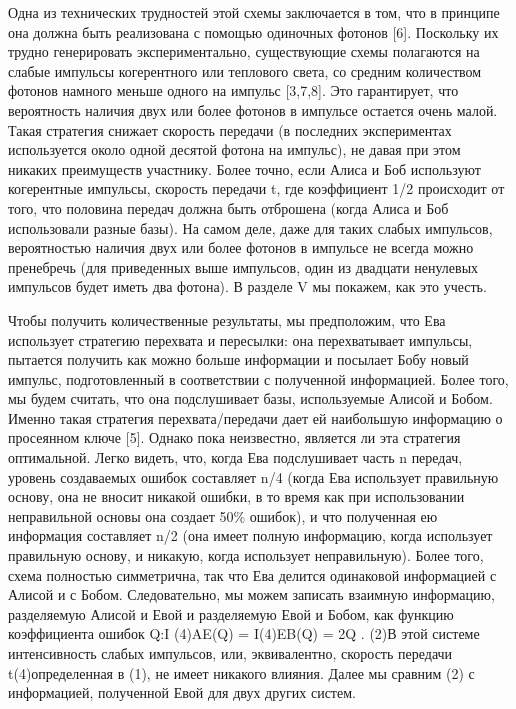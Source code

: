 Одна из технических трудностей этой схемы заключается в том, что в принципе она должна быть реализована с помощью одиночных фотонов [6]. Поскольку их трудно генерировать экспериментально, существующие схемы полагаются на слабые импульсы когерентного или теплового света, со средним количеством фотонов намного меньше одного на импульс [3,7,8]. Это гарантирует, что вероятность наличия двух или более фотонов в импульсе остается очень малой. Такая стратегия снижает скорость передачи (в последних экспериментах используется около одной десятой фотона на импульс), не давая при этом никаких преимуществ участнику. Более точно, если Алиса и Боб используют когерентные импульсы, скорость передачи t, где коэффициент 1/2 происходит от того, что половина передач должна быть отброшена (когда Алиса и Боб использовали разные базы). На самом деле, даже для таких слабых импульсов, вероятностью наличия двух или более фотонов в импульсе не всегда можно пренебречь (для приведенных выше импульсов, один из двадцати ненулевых импульсов будет иметь два фотона). В разделе V мы покажем, как это учесть.

Чтобы получить количественные результаты, мы предположим, что Ева использует стратегию перехвата и пересылки: она перехватывает импульсы, пытается получить как можно больше информации и посылает Бобу новый импульс, подготовленный в соответствии с полученной информацией. Более того, мы будем считать, что она подслушивает базы, используемые Алисой и Бобом. Именно такая стратегия перехвата/передачи дает ей наибольшую информацию о просеянном ключе [5]. Однако пока неизвестно, является ли эта стратегия оптимальной. Легко видеть, что, когда Ева подслушивает часть n передач, уровень создаваемых ошибок составляет n/4 (когда Ева использует правильную основу, она не вносит никакой ошибки, в то время как при использовании неправильной основы она создает 50\% ошибок), и что полученная ею информация составляет n/2 (она имеет полную информацию, когда использует правильную основу, и никакую, когда использует неправильную). Более того, схема полностью симметрична, так что Ева делится одинаковой информацией с Алисой и с Бобом. Следовательно, мы можем записать взаимную информацию, разделяемую Алисой и Евой и разделяемую Евой и Бобом, как функцию коэффициента ошибок Q:I
(4)AE(Q) = I(4)EB(Q) = 2Q . (2)В этой системе интенсивность слабых импульсов, или, эквивалентно, скорость передачи t(4)определенная в (1), не имеет никакого влияния. Далее мы сравним (2) с информацией, полученной Евой для двух других систем.

